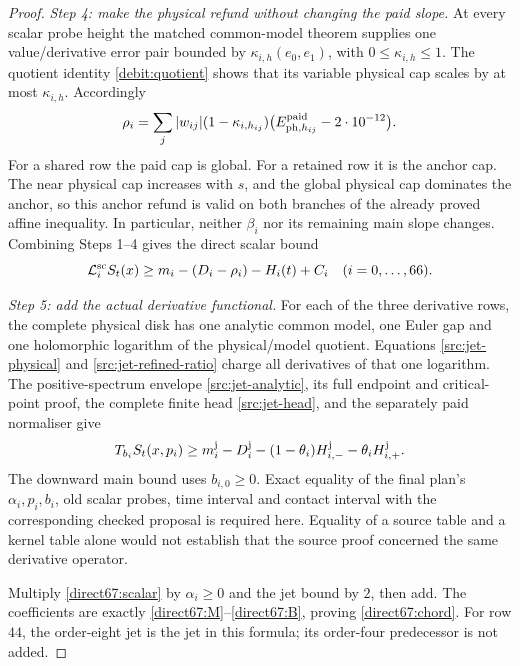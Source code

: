 \documentclass[11pt,a4paper]{article}
\theoremstyle{definition}
\theoremstyle{remark}
\begin{document}
\begin{proof}
\emph{Step 4: make the physical refund without changing the paid slope.}
At every scalar probe height the matched common-model theorem supplies
one value/derivative error pair bounded by
$\kappa_{i,h}(e_0,e_1)$, with $0\le\kappa_{i,h}\le1$.
The quotient identity \eqref{debit:quotient} shows that its variable
physical cap scales by at most $\kappa_{i,h}$.  Accordingly
\begin{equation}
 \rho_i=\sum_j|w_{ij}|(1-\kappa_{i,h_{ij}})
           \bigl(E_{{\rm ph},h_{ij}}^{\rm paid}-2\cdot10^{-12}\bigr).
 \label{direct67:refund}
\end{equation}
For a shared row the paid cap is global.  For a retained row it is the
anchor cap.  The near physical cap increases with $s$, and the global
physical cap dominates the anchor, so this anchor refund is valid on
both branches of the already proved affine inequality.  In particular,
neither $\beta_i$ nor its remaining main slope changes.  Combining
Steps 1--4 gives the direct scalar bound
\begin{equation}
 \mathcal L_i^{\rm sc}S_t(x)
 \ge m_i-(D_i-\rho_i)-H_i(t)+C_i
       \quad(i=0,\ldots,66).
 \label{direct67:scalar}
\end{equation}

\emph{Step 5: add the actual derivative functional.}
For each of the three derivative rows, the complete physical disk
has one analytic common model, one Euler gap and one holomorphic
logarithm of the physical/model quotient.  Equations
\eqref{src:jet-physical} and \eqref{src:jet-refined-ratio} charge all
derivatives of that one logarithm.  The positive-spectrum envelope
\eqref{src:jet-analytic}, its full endpoint and critical-point proof,
the complete finite head \eqref{src:jet-head}, and the separately paid
normaliser give
\[
 T_{b_i}S_t(x,p_i)\ge
 m_i^{\rm j}-D_i^{\rm j}
       -(1-\theta_i)H_{i,-}^{\rm j}-\theta_iH_{i,+}^{\rm j}.
\]
The downward main bound uses $b_{i,0}\ge0$.  Exact equality of the
final plan's $\alpha_i,p_i,b_i$, old scalar probes, time interval and
contact interval with the corresponding checked proposal is required
here.  Equality of a source table and a kernel table alone would not
establish that the source proof concerned the same derivative operator.

Multiply \eqref{direct67:scalar} by $\alpha_i\ge0$ and the jet bound
by $2$, then add.  The coefficients are exactly
\eqref{direct67:M}--\eqref{direct67:B}, proving
\eqref{direct67:chord}.  For row $44$, the order-eight jet is the jet
in this formula; its order-four predecessor is not added.


\end{proof}
\end{document}
